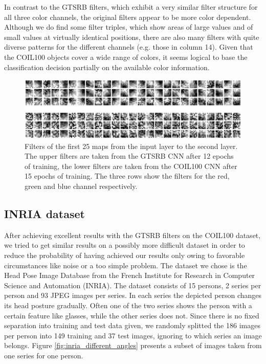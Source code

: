 \documentclass[11pt, a4paper]{article}
\begin{document}
In contrast to the GTSRB filters, which exhibit a very similar filter structure for all three color channels, the original filters appear to be more color dependent. Although we do find some filter triples, which show areas of large values and of small values at virtually identical positions, there are also many filters with quite diverse patterns for the different channels (e.g. those in column 14). Given that the COIL100 objects cover a wide range of colors, it seems logical to base the classification decision partially on the available color information.

\begin{figure}[h!]
	\centering
	\includegraphics[width=1\textwidth]{filter_visualizations/gtsrb_vs_coil_filters}
	\caption{Filters of the first 25 maps from the input layer to the second layer. The upper filters are taken from the GTSRB CNN after 12 epochs of training, the lower filters are taken from the COIL100 CNN after 15 epochs of training. The three rows show the filters for the red, green and blue channel respectively.}
	\label{fig:gtsrb_vs_coil_filters}
\end{figure}


\subsection{INRIA dataset}
\label{subsec:inria}

After achieving excellent results with the GTSRB filters on the COIL100 dataset, we tried to get similar results on a possibly more difficult dataset in order to reduce the probability of having achieved our results only owing to favorable circumstances like noise or a too simple problem. The dataset we chose is the Head Pose Image Database \cite{estimating-face-orientation-inria} from the French Institute for Research in Computer Science and Automation (INRIA). The dataset consists of 15 persons, 2 series per person and 93 JPEG images per series. In each series the depicted person changes its head posture gradually. Often one of the two series shows the person with a certain feature like glasses, while the other series does not. Since there is no fixed separation into training and test data given, we randomly splitted the 186 images per person into 149 training and 37 test images, ignoring to which series an image belongs. Figure \ref{fig:inria_different_angles} presents a subset of images taken from one series for one person.\\
\end{document}
